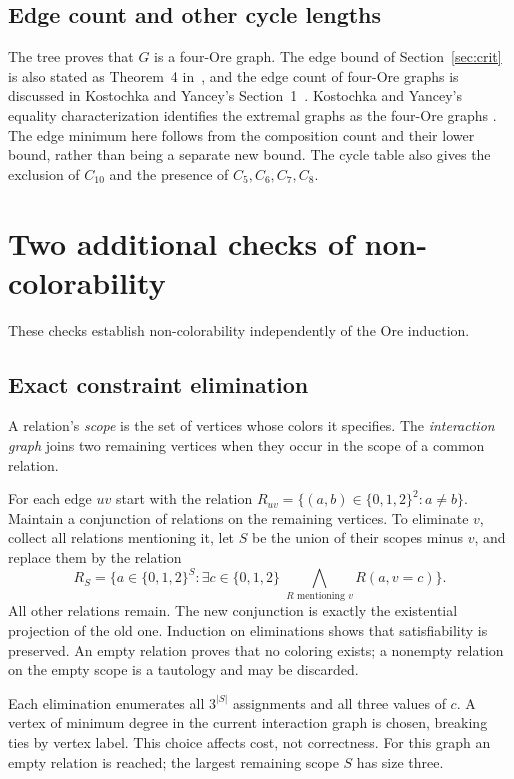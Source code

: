 \documentclass[11pt]{article}
\begin{document}
\begin{appendices}
\subsection{Edge count and other cycle lengths}
The tree proves that $G$ is a four-Ore graph.
The edge bound of Section~\ref{sec:crit} is also stated as Theorem~4
in~\cite{ky}, and the edge count of four-Ore graphs is discussed in
Kostochka and Yancey's Section~1~\cite{ky}.
Kostochka and Yancey's equality characterization identifies the extremal
graphs as the four-Ore graphs \cite[Theorem~6]{ky}. The edge minimum here
follows from the composition count and their lower bound, rather than
being a separate new bound.
The cycle table also gives the exclusion of $C_{10}$ and the presence of
$C_5,C_6,C_7,C_8$.

\clearpage
\section{Two additional checks of non-colorability}\label{app:additional}
These checks establish non-colorability independently of the Ore induction.

\subsection{Exact constraint elimination}
A relation's \emph{scope} is the set of vertices whose colors it specifies.
The \emph{interaction graph} joins two remaining vertices when they occur
in the scope of a common relation.

For each edge $uv$ start with the relation
$R_{uv}=\{(a,b)\in\{0,1,2\}^2:a\ne b\}$.
Maintain a conjunction of relations on the remaining vertices. To
eliminate $v$, collect all relations mentioning it, let $S$ be the union
of their scopes minus $v$, and replace them by the relation
\[
 R_S=\{a\in\{0,1,2\}^S:
          \exists c\in\{0,1,2\}\;
          \bigwedge_{R\text{ mentioning }v}R(a,v=c)\}.
\]
All other relations remain. The new conjunction is exactly the
existential projection of the old one. Induction on eliminations shows
that satisfiability is preserved. An empty relation proves that no
coloring exists; a nonempty relation on the empty scope is a tautology
and may be discarded.

Each elimination enumerates all $3^{|S|}$ assignments and all three
values of $c$. A vertex of minimum degree in the current interaction
graph is chosen, breaking ties by vertex label. This choice affects cost,
not correctness. For this graph an empty relation is reached; the largest
remaining scope $S$ has size three.


\end{appendices}
\end{document}
